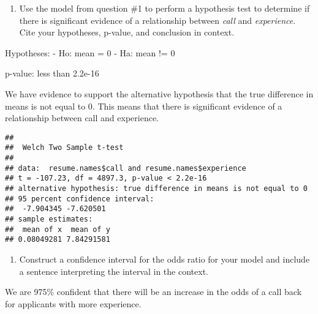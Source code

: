 \documentclass[
]{article}
\newenvironment{Shaded}{\begin{snugshade}}{\end{snugshade}}
\newcommand{\DecValTok}[1]{\textcolor[rgb]{0.00,0.00,0.81}{#1}}
\newcommand{\FloatTok}[1]{\textcolor[rgb]{0.00,0.00,0.81}{#1}}
\newcommand{\KeywordTok}[1]{\textcolor[rgb]{0.13,0.29,0.53}{\textbf{#1}}}
\newcommand{\NormalTok}[1]{#1}
\newcommand{\OperatorTok}[1]{\textcolor[rgb]{0.81,0.36,0.00}{\textbf{#1}}}
\newcommand{\StringTok}[1]{\textcolor[rgb]{0.31,0.60,0.02}{#1}}
\providecommand{\tightlist}{%
  \setlength{\itemsep}{0pt}\setlength{\parskip}{0pt}}
\begin{document}
\begin{enumerate}
\def\labelenumi{\arabic{enumi})}
\setcounter{enumi}{4}
\tightlist
\item
  Use the model from question \#1 to perform a hypothesis test to
  determine if there is significant evidence of a relationship between
  \emph{call} and \emph{experience}. Cite your hypotheses, p-value, and
  conclusion in context.
\end{enumerate}

Hypotheses: - Ho: mean = 0 - Ha: mean != 0

p-value: less than 2.2e-16

We have evidence to support the alternative hypothesis that the true
difference in means is not equal to 0. This means that there is
significant evidence of a relationship between call and experience.

\begin{Shaded}
\end{Shaded}

\begin{verbatim}
## 
##  Welch Two Sample t-test
## 
## data:  resume.names$call and resume.names$experience
## t = -107.23, df = 4897.3, p-value < 2.2e-16
## alternative hypothesis: true difference in means is not equal to 0
## 95 percent confidence interval:
##  -7.904345 -7.620501
## sample estimates:
##  mean of x  mean of y 
## 0.08049281 7.84291581
\end{verbatim}

\begin{enumerate}
\def\labelenumi{\arabic{enumi})}
\setcounter{enumi}{5}
\tightlist
\item
  Construct a confidence interval for the odds ratio for your model and
  include a sentence interpreting the interval in the context.
\end{enumerate}

We are 975\% confident that there will be an increase in the odds of a
call back for applicants with more experience.

\begin{Shaded}
\end{Shaded}
\end{document}
